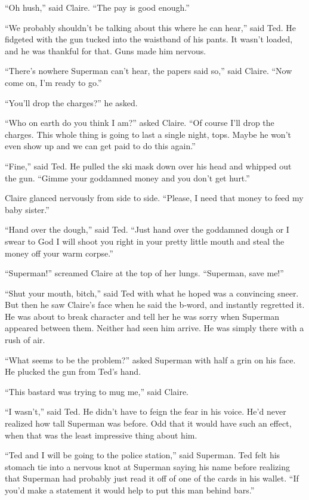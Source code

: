 ``Oh hush,'' said Claire. ``The pay is good enough.''

``We probably shouldn't be talking about this where he can hear,'' said
Ted. He fidgeted with the gun tucked into the waistband of his pants. It
wasn't loaded, and he was thankful for that. Guns made him nervous.

``There's nowhere Superman can't hear, the papers said so,'' said
Claire. ``Now come on, I'm ready to go.''

``You'll drop the charges?'' he asked.

``Who on earth do you think I am?'' asked Claire. ``Of course I'll drop
the charges. This whole thing is going to last a single night, tops.
Maybe he won't even show up and we can get paid to do this again.''

``Fine,'' said Ted. He pulled the ski mask down over his head and
whipped out the gun. ``Gimme your goddamned money and you don't get
hurt.''

Claire glanced nervously from side to side. ``Please, I need that money
to feed my baby sister.''

``Hand over the dough,'' said Ted. ``Just hand over the goddamned dough
or I swear to God I will shoot you right in your pretty little mouth and
steal the money off your warm corpse.''

``Superman!'' screamed Claire at the top of her lungs. ``Superman, save
me!''

``Shut your mouth, bitch,'' said Ted with what he hoped was a convincing
sneer. But then he saw Claire's face when he said the b‐word, and
instantly regretted it. He was about to break character and tell her he
was sorry when Superman appeared between them. Neither had seen him
arrive. He was simply there with a rush of air.

``What seems to be the problem?'' asked Superman with half a grin on his
face. He plucked the gun from Ted's hand.

``This bastard was trying to mug me,'' said Claire.

``I wasn't,'' said Ted. He didn't have to feign the fear in his voice.
He'd never realized how tall Superman was before. Odd that it would have
such an effect, when that was the least impressive thing about him.

``Ted and I will be going to the police station,'' said Superman. Ted
felt his stomach tie into a nervous knot at Superman saying his name
before realizing that Superman had probably just read it off of one of
the cards in his wallet. ``If you'd make a statement it would help to
put this man behind bars.''

